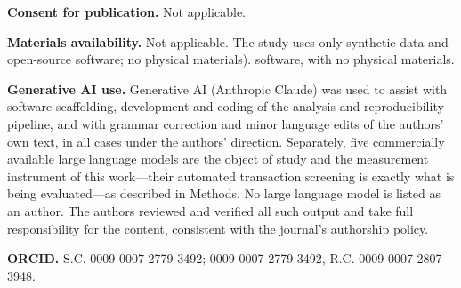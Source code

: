 \documentclass[pdflatex,sn-basic,Numbered]{sn-jnl}
\newcommand{\HLtext}[1]{\texthl{#1}}
\newcommand{\HLdel}[1]{\textcolor{HLink}{\sout{#1}}}
\renewcommand{\HLtext}[1]{#1}\renewcommand{\HLdel}[1]{#1}%
\begin{document}
\textbf{Consent for publication.} \HLtext{Not applicable.}

\textbf{Materials availability.} \HLtext{Not applicable. The} study uses only synthetic data and open-source \HLdel{software; no physical materials).} \HLtext{software, with no physical materials.}

\textbf{Generative AI use.} Generative AI (Anthropic Claude) was used to assist with software scaffolding, development and coding of the analysis and reproducibility pipeline, and with grammar correction and minor language edits of the authors' own text, in all cases under the authors' direction. Separately, five commercially available large language models are the object of study and the measurement instrument of this work---their automated transaction screening is exactly what is being evaluated---as described in Methods. No large language model is listed as an author. The authors reviewed and verified all such output and take full responsibility for the content, consistent with the journal's authorship policy.

\textbf{ORCID.} S.C. \HLdel{0009-0007-2779-3492;} \HLtext{0009-0007-2779-3492,} R.C. 0009-0007-2807-3948.


\end{document}
